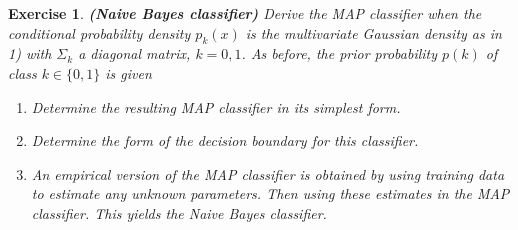 \documentclass[12pt]{article}
\theoremstyle{colon}
\newtheorem{exercise}{Exercise}
\begin{document}
\clearpage

\begin{exercise}
  \textbf{(Naive Bayes classifier)} Derive the MAP classifier when the conditional probability density $p_k(x)$ is the multivariate Gaussian density as in 1) with $\Sigma_k$ a diagonal matrix, $k = 0, 1$. As before, the prior probability $p(k)$ of class $k \in \{0, 1\}$ is given

  \begin{enumerate}[label=\alph*)]
    \item Determine the resulting MAP classifier in its simplest form.
    \item Determine the form of the decision boundary for this classifier.
    \item An empirical version of the MAP classifier is obtained by using training data to estimate any unknown parameters. Then using these estimates in the MAP classifier. This yields the Naive Bayes classifier.
  \end{enumerate}
\end{exercise}
\end{document}
